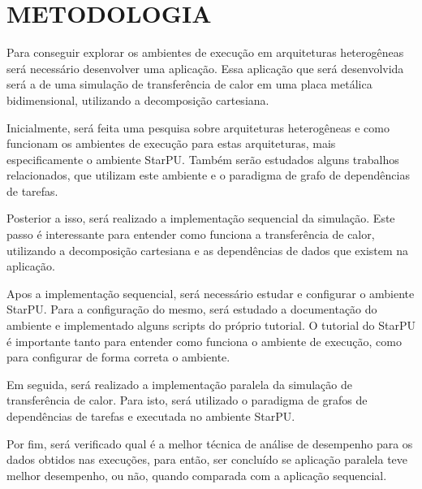 
\chapter{METODOLOGIA}
\label{chap:metodologia}

Para conseguir explorar os ambientes de execução em arquiteturas heterogêneas será necessário desenvolver uma aplicação.
Essa aplicação que será desenvolvida será a de uma simulação de transferência de calor em uma placa metálica bidimensional,
utilizando a decomposição cartesiana.

Inicialmente, será feita uma pesquisa sobre arquiteturas heterogêneas e como funcionam os ambientes de execução para estas arquiteturas,
mais especificamente o ambiente StarPU.
Também serão estudados alguns trabalhos relacionados, que utilizam este ambiente e o paradigma de grafo de dependências de tarefas.

Posterior a isso, será realizado a implementação sequencial da simulação.
Este passo é interessante para entender como funciona a transferência de calor, utilizando a decomposição cartesiana e as dependências de
dados que existem na aplicação.

Apos a implementação sequencial, será necessário estudar e configurar o ambiente StarPU. Para a configuração do mesmo,
será estudado a documentação do ambiente e implementado alguns scripts do próprio tutorial.
O tutorial do StarPU é importante tanto para entender como funciona o ambiente de execução, como para configurar de forma correta o ambiente.

Em seguida, será realizado a implementação paralela da simulação de transferência de calor.
Para isto, será utilizado o paradigma de grafos de dependências de tarefas e executada no ambiente StarPU.

Por fim, será verificado qual é a melhor técnica de análise de desempenho para os dados obtidos nas execuções,
para então, ser concluído se aplicação paralela teve melhor desempenho, ou não, quando comparada com a aplicação sequencial.
